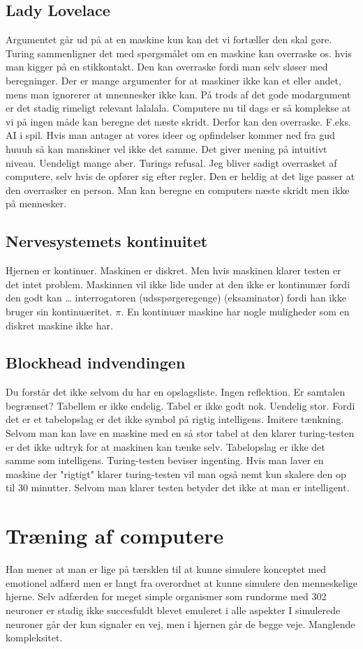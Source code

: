 \documentclass{article}
\begin{document}
\subsection{Lady Lovelace}
Argumentet går ud på at en maskine kun kan det vi fortæller den skal gøre. Turing sammenligner det med spørgsmålet om en maskine kan overraske os. hvis man kigger på en stikkontakt. Den kan overraske fordi man selv sløser med beregninger.
Der er mange argumenter for at maskiner ikke kan et eller andet, mens man ignorerer at mnennesker ikke kan.
På trods af det gode modargument er det stadig rimeligt relevant lalalala.
Computere nu til dags er så komplekse at vi på ingen måde kan beregne det næste skridt. Derfor kan den overraske. F.eks. AI i spil.
Hvis man antager at vores ideer og opfindelser kommer ned fra gud huuuh så kan manskiner vel ikke det samme.
Det giver mening på intuitivt niveau.
Uendeligt mange aber.
Turings refusal. Jeg bliver sadigt overrasket af computere, selv hvis de opfører sig efter regler. Den er heldig at det lige passer at den overrasker en person.
Man kan beregne en computers næste skridt men ikke på mennesker.

\subsection{Nervesystemets kontinuitet}
Hjernen er kontinuer. Maskinen er diskret. Men hvis maskinen klarer testen er det intet problem.
Maskinnen vil ikke lide under at den ikke er kontinunær fordi den godt kan … interrogatoren (udsspørgeregenge) (eksaminator) fordi han ikke bruger sin  kontinuæritet. $\pi$. En kontinuær maskine har nogle muligheder som en diskret maskine ikke har.

\subsection{Blockhead indvendingen}
Du forstår det ikke selvom du har en opslagsliste. Ingen reflektion. 
Er samtalen begrænset? Tabellem er ikke endelig. Tabel er ikke godt nok. Uendelig stor. Fordi det er et tabelopslag er det ikke symbol på rigtig intelligens. Imitere tænkning.
Selvom man kan lave en maskine med en så stor tabel at den klarer turing-testen er det ikke udtryk for at maskinen kan tænke selv. Tabelopslag er ikke det samme som intelligens. Turing-testen beviser ingenting.
Hvis man laver en maskine der "rigtigt" klarer turing-testen vil man også nemt kun skalere den op til 30 minutter.
Selvom man klarer testen betyder det ikke at man er intelligent.


\section{Træning af computere}
Han mener at man er lige på tærsklen til at kunne simulere konceptet med emotionel adfærd men er langt fra overordnet at kunne simulere den menneskelige hjerne.
Selv adfærden for meget simple organismer som rundorme med 302 neuroner er stadig ikke succesfuldt blevet emuleret i alle aspekter
I simulerede neuroner går der kun signaler en vej, men i hjernen går de begge veje. Manglende kompleksitet.
\end{document}
